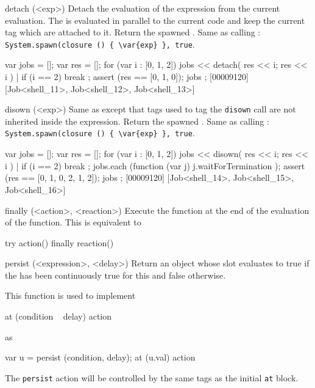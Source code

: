 \begin{urbiscriptapi}
\item[detach](<exp>)%
  Detach the evaluation of the expression  from the current
  evaluation.  The  is evaluated in parallel to the current code
  and keep the current tag which are attached to it.  Return the spawned
  .  Same as calling :
  \lstinline|System.spawn(closure () { \var{exp} }, true|.

\begin{urbiscript}
{
  var jobs = [];
  var res = [];
  for (var i : [0, 1, 2])
  {
    jobs << detach({ res << i; res << i }) |
    if (i == 2)
      break
  };
  assert (res == [0, 1, 0]);
  jobs
};
[00009120] [Job<shell_11>, Job<shell_12>, Job<shell_13>]
\end{urbiscript}


\item[disown](<exp>)%
  Same as  except that tags used to tag the
  \lstinline|disown| call are not inherited inside the expression.  Return
  the spawned .  Same as calling :
  \lstinline|System.spawn(closure () { \var{exp} }, true|.

\begin{urbiscript}
{
  var jobs = [];
  var res = [];
  for (var i : [0, 1, 2])
  {
    jobs << disown({ res << i; res << i }) |
    if (i == 2)
      break
  };
  jobs.each (function (var j) { j.waitForTermination });
  assert (res == [0, 1, 0, 2, 1, 2]);
  jobs
};
[00009120] [Job<shell_14>, Job<shell_15>, Job<shell_16>]
\end{urbiscript}


\item[finally](<action>, <reaction>)%
  Execute the  function at the end of the evaluation of
  the  function.  This is equivalent to

\begin{urbiunchecked}
{
  try
  {
    action()
  }
  finally
  {
    reaction()
  }
}
\end{urbiunchecked}


\item[persist](<expression>, <delay>)%
  Return an object whose  slot evaluates to true if the
   has been continuously true for this  and false
  otherwise.

  This function is used to implement

\begin{urbiunchecked}
at (condition ~ delay)
  action
\end{urbiunchecked}

  \noindent
  as

\begin{urbiunchecked}
var u = persist (condition, delay);
at (u.val)
  action
\end{urbiunchecked}

  The \lstinline|persist| action will be controlled by the same tags
  as the initial \lstinline|at| block.



\end{urbiscriptapi}


